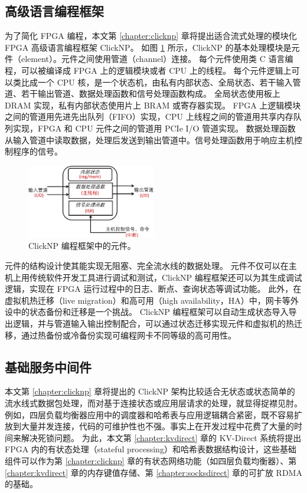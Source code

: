 \subsection{高级语言编程框架}

为了简化 FPGA 编程，本文第 \ref{chapter:clicknp} 章将提出适合流式处理的模块化 FPGA 高级语言编程框架 ClickNP。
如图 \ref{arch:fig:element_arch} 所示，ClickNP 的基本处理模块是元件（element）。元件之间使用管道（channel）连接。
每个元件使用类 C 语言编程，可以被编译成 FPGA 上的逻辑模块或者 CPU 上的线程。
每个元件逻辑上可以类比成一个 CPU 核，是一个状态机，由私有内部状态、全局状态、若干输入管道、若干输出管道、数据处理函数和信号处理函数构成。
全局状态使用板上 DRAM 实现，私有内部状态使用片上 BRAM 或寄存器实现。
FPGA 上逻辑模块之间的管道用先进先出队列（FIFO）实现，CPU 上线程之间的管道用共享内存队列实现，FPGA 和 CPU 元件之间的管道用 PCIe I/O 管道实现。
数据处理函数从输入管道中读取数据，处理后发送到输出管道中。信号处理函数用于响应主机控制程序的信号。

\begin{figure}[htbp]
	\centering
	\includegraphics[width=0.5\textwidth]{chapters/clicknp/image/element_arch.pdf}
	\caption{ClickNP 编程框架中的元件。}
	\label{arch:fig:element_arch}
\end{figure}

元件的结构设计使其能实现无阻塞、完全流水线的数据处理。
元件不仅可以在主机上用传统软件开发工具进行调试和测试，ClickNP 编程框架还可以为其生成调试逻辑，实现在 FPGA 运行过程中的日志、断点、查询状态等调试功能。
此外，在虚拟机热迁移（live migration）和高可用（high availability，HA）中，网卡等外设中的状态备份和迁移是一个挑战。
ClickNP 编程框架可以自动生成状态导入导出逻辑，并与管道输入输出控制配合，可以通过状态迁移实现元件和虚拟机的热迁移，通过热备份或冷备份实现可编程网卡不同等级的高可用性。

\subsection{基础服务中间件}

本文第 \ref{chapter:clicknp} 章将提出的 ClickNP 架构比较适合无状态或状态简单的流水线式数据包处理，而对基于连接状态或应用层请求的处理，就显得捉襟见肘。
例如，四层负载均衡器应用中的调度器和哈希表与应用逻辑耦合紧密，既不容易扩放到大量并发连接，代码的可维护性也不强。事实上在开发过程中花费了大量的时间来解决死锁问题。
为此，本文第 \ref{chapter:kvdirect} 章的 KV-Direct 系统将提出 FPGA 内的有状态处理（stateful processing）和哈希表数据结构设计，这些基础组件可以作为第 \ref{chapter:clicknp} 章的有状态网络功能（如四层负载均衡器）、第 \ref{chapter:kvdirect} 章的内存键值存储、第 \ref{chapter:socksdirect} 章的可扩放 RDMA 的基础。

